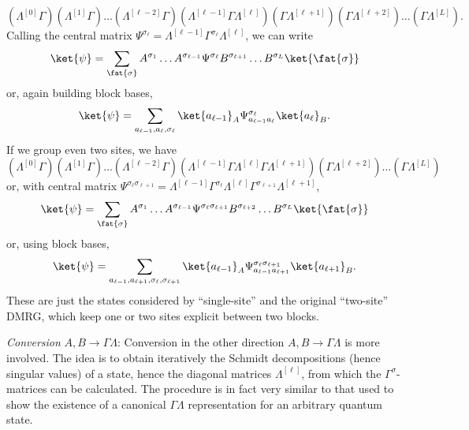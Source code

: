 \begin{equation}
(\Lambda^{[0]}\Gamma)(\Lambda^{[1]}\Gamma)\ldots(\Lambda^{[\ell-2]}\Gamma)(\Lambda^{[\ell-1]}\Gamma \Lambda^{[\ell]}) (\Gamma\Lambda^{[\ell+1]})(\Gamma\Lambda^{[\ell+2]}) \ldots (\Gamma\Lambda^{[L]}) .
\end{equation}
Calling the central matrix $\Psi^{\sigma_\ell}= \Lambda^{[\ell-1]}\Gamma^{\sigma_\ell} \Lambda^{[\ell]}$, we can write 
\begin{equation}
\ket{\psi} = \sum_{\fat{\sigma}} A^{\sigma_1} \ldots A^{\sigma_{\ell-1}} \Psi^{\sigma_\ell} B^{\sigma_{\ell+1}} \ldots B^{\sigma_L}
\ket{\fat{\sigma}}
\end{equation}
or, again building block bases,
\begin{equation}
\ket{\psi} = \sum_{a_{\ell-1},a_{\ell},\sigma_\ell} \ket{a_{\ell-1}}_A \Psi^{\sigma_\ell}_{a_{\ell-1}a_\ell} \ket{a_\ell}_B .
\end{equation}
If we group even two sites, we have
\begin{equation}
(\Lambda^{[0]}\Gamma)(\Lambda^{[1]}\Gamma)\ldots(\Lambda^{[\ell-2]}\Gamma)(\Lambda^{[\ell-1]}\Gamma \Lambda^{[\ell]} \Gamma\Lambda^{[\ell+1]})(\Gamma\Lambda^{[\ell+2]}) \ldots (\Gamma\Lambda^{[L]}) 
\end{equation}
or, with central matrix $\Psi^{\sigma_\ell \sigma_{\ell+1}}=\Lambda^{[\ell-1]}\Gamma^{\sigma_\ell} \Lambda^{[\ell]} \Gamma^{\sigma_{\ell+1}}\Lambda^{[\ell+1]}$,
\begin{equation}
\ket{\psi} = \sum_{\fat{\sigma}} A^{\sigma_1} \ldots A^{\sigma_{\ell-1}} \Psi^{\sigma_\ell \sigma_{\ell+1}} B^{\sigma_{\ell+2}} \ldots B^{\sigma_L} \ket{\fat{\sigma}}
\end{equation}
or, using block bases,
\begin{equation}
\ket{\psi} = \sum_{a_{\ell-1},a_{\ell+1},\sigma_\ell,\sigma_{\ell+1}} \ket{a_{\ell-1}}_A \Psi^{\sigma_\ell \sigma_{\ell+1}}_{a_{\ell-1}a_{\ell+1}} \ket{a_{\ell+1}}_B .
\end{equation}
These are just the states considered by ``single-site'' and the original ``two-site'' DMRG, which keep one or two sites explicit between two blocks.

{\em Conversion} $A,B \rightarrow \Gamma\Lambda$: Conversion in the other direction $A,B \rightarrow \Gamma\Lambda$ is more involved. The idea is to obtain iteratively the Schmidt decompositions (hence singular values) of a state, hence the diagonal matrices $\Lambda^{[\ell]}$, from which the $\Gamma^{\sigma}$-matrices can be calculated. The procedure is in fact very similar to that used to show the existence of a canonical $\Gamma\Lambda$ representation for an arbitrary quantum state.

